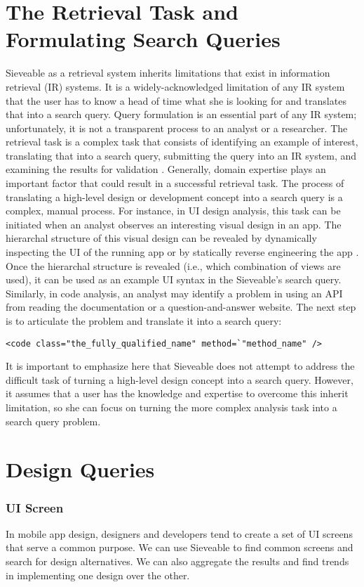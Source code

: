 \section{The Retrieval Task and Formulating Search Queries}
Sieveable as a retrieval system inherits limitations that exist in information retrieval (IR) systems.
It is a widely-acknowledged limitation of any IR system that the user has to know a head of time what she is looking for and translates that into a search query.
Query formulation is an essential part of any IR system; unfortunately, it is not a transparent process to an analyst or a researcher.
The retrieval task is a complex task that consists of identifying an example of interest, translating that into a search query, submitting the query into an IR system, and examining the results for validation \cite{jones1997readings}.
Generally, domain expertise plays an important factor that could result in a successful retrieval task.
The process of translating a high-level design or development concept into a search query is a complex, manual process.
For instance, in UI design analysis, this task can be initiated when an analyst observes an interesting visual design in an app.
The hierarchal structure of this visual design can be revealed by dynamically inspecting the UI of the running app \cite{hierarchy_viewer} or by statically reverse engineering the app \cite{apktool}.
Once the hierarchal structure is revealed (i.e., which combination of views are used), it can be used as an example UI syntax in the Sieveable's search query.
Similarly, in code analysis, an analyst may identify a problem in using an API from reading the documentation or a question-and-answer website.
The next step is to articulate the problem and translate it into a search query:
\begin{verbatim}
<code class="the_fully_qualified_name" method=`"method_name" />
\end{verbatim}
It is important to emphasize here that Sieveable does not attempt to address the difficult task of turning a high-level design concept into a search query.
However, it assumes that a user has the knowledge and expertise to overcome this inherit limitation, so she can focus on turning the more complex analysis task into a search query problem.

\section{Design Queries}
\subsubsection{UI Screen}
In mobile app design, designers and developers tend to create a set of UI screens that serve a common purpose. 
We can use Sieveable to find common screens and search for design alternatives.
We can also aggregate the results and find trends in implementing one design over the other.

